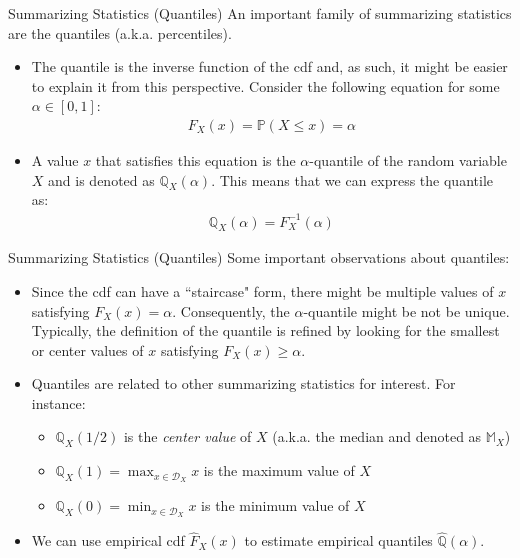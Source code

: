 \documentclass[9pt]{beamer}
\begin{document}
%
\begin{frame}{Summarizing Statistics (Quantiles)}
An important family of summarizing statistics are the quantiles (a.k.a. percentiles). 
\begin{block}{}
\begin{itemize}
\item The quantile is the inverse function of the cdf and, as such, it might be easier to explain it from this perspective.  Consider the following equation for some $\alpha \in [0,1]$:
\begin{align*}
F_X(x)=\mathbb{P}(X\leq x)=\alpha 
\end{align*}
\item A value $x$ that satisfies this equation is the $\alpha$-quantile of the random variable $X$ and is denoted as $\mathbb{Q}_X(\alpha)$. This means that we can express the quantile as:
\begin{align*}
\mathbb{Q}_X(\alpha)=F^{-1}_X(\alpha) 
\end{align*}
\end{itemize}
\end{block}
\end{frame}

%
\begin{frame}{Summarizing Statistics (Quantiles)}
Some important observations about quantiles:
\begin{block}{}
\begin{itemize}
 \setlength{\itemsep}{10pt}
\item Since the cdf can have a ``staircase" form, there might be multiple values of $x$ satisfying $F_X(x)=\alpha$. Consequently, the $\alpha$-quantile might be not be unique. Typically,  the definition of the quantile is refined by looking for the smallest or center values of $x$ satisfying $F_X(x)\geq \alpha$. 

\item Quantiles are related to other summarizing statistics for interest. For instance: 
\begin{itemize}
\item $\mathbb{Q}_{X}(1/2)$ is the {\em center value} of $X$ (a.k.a. the median and denoted as $\mathbb{M}_X$)
\item $\mathbb{Q}_X(1)=\displaystyle\max_{x\in \mathcal{D}_X }x$ is the maximum value of $X$
\item $\mathbb{Q}_{X}(0)=\displaystyle \min_{x\in \mathcal{D}_X }x$ is the minimum value of $X$ 
\end{itemize}
\item We can use empirical cdf $\hat{F}_X(x)$ to estimate empirical quantiles $\hat{\mathbb{Q}}(\alpha)$.
\end{itemize}
\end{block}
\end{frame}
\end{document}
